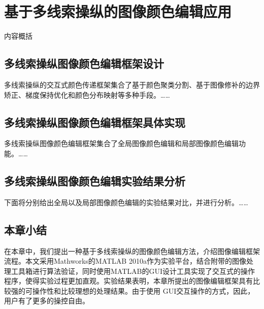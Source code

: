\chapter{基于多线索操纵的图像颜色编辑应用}
内容概括

\section{多线索操纵图像颜色编辑框架设计}
多线索操纵的交互式颜色传递框架集合了基于颜色聚类分割、基于图像修补的边界矫正、梯度保持优化和颜色分布映射等多种手段\cite{Zuo10}。……

\section{多线索操纵图像颜色编辑框架具体实现}
多线索操纵图像颜色编辑框架集合了全局图像颜色编辑和局部图像颜色编辑功能。……

\section{多线索操纵图像颜色编辑实验结果分析}
下面将分别给出全局以及局部图像颜色编辑的实验结果对比，并进行分析。……

\section{本章小结}
在本章中，我们提出一种基于多线索操纵的图像颜色编辑方法，介绍图像编辑框架流程。本文采用Mathworks的MATLAB 2010a作为实验平台，结合附带的图像处理工具箱进行算法验证，同时使用MATLAB的GUI设计工具实现了交互式的操作程序，使得实验过程更加直观。实验结果表明，本章所提出的图像编辑框架具有比较强的可操作性和比较理想的处理结果。由于使用 GUI交互操作的方式，因此，用户有了更多的操控自由。


